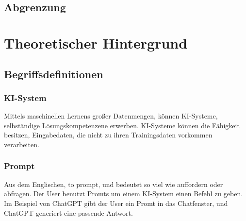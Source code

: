 \documentclass[12pt,a4paper,bibliography=totocnumbered,listof=totocnumbered]{scrartcl}
\begin{document}
\subsection{Abgrenzung}

\section{Theoretischer Hintergrund}

\subsection{Begriffsdefinitionen}%

\subsubsection{KI-System} %
Mittels maschinellen Lernens großer Datenmengen, können KI-Systeme, selbständige Lösungskompetenzene  erwerben. KI-Systeme können die Fähigkeit besitzen, Eingabedaten, die nicht zu ihren Trainingsdaten vorkommen verarbeiten.
\subsubsection{Prompt} %
 Aus dem Englischen, to prompt, und bedeutet so viel wie auffordern oder abfragen. Der User benutzt Promts um einem KI-System einen Befehl zu geben. Im Beispiel von ChatGPT gibt der User ein Promt in das Chatfenster, und ChatGPT generiert eine passende Antwort.
\end{document}
